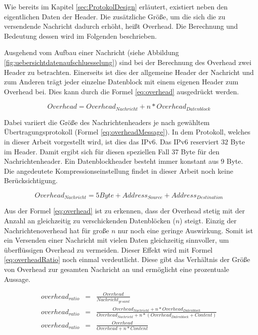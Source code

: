 Wie bereits im Kapitel \ref{sec:ProtokolDesign} erläutert, existiert neben den
eigentlichen Daten der Header. Die zusätzliche Größe, um die sich die
zu versendende Nachricht dadurch erhöht, heißt Overhead. Die Berechnung und
Bedeutung dessen wird im Folgenden beschrieben.

Ausgehend vom Aufbau einer Nachricht (siehe Abbildung
\ref{fig:uebersichtdatenaufschluesselung}) sind bei der Berechnung des Overhead
zwei Header zu betrachten. Einerseits ist dies der allgemeine Header der
Nachricht und zum Anderen trägt jeder einzelne Datenblock
mit einem eigenen Header zum Overhead bei. Dies kann durch die Formel
\ref{eq:overhead} ausgedrückt werden.

\begin{equation}
	Overhead = Overhead_{Nachricht} + n * Overhead_{Datenblock}
	\label{eq:overhead}
\end{equation}

Dabei variiert die Größe des Nachrichtenheaders je nach gewähltem
Übertragungsprotokoll (Formel \ref{eq:overheadMessage}). In dem Protokoll,
welches in dieser Arbeit vorgestellt wird, ist dies das IPv6. Das IPv6
reserviert $32$ Byte im Header. Damit ergibt sich für diesen speziellen Fall $37$ Byte für
den Nachrichtenheader. Ein Datenblockheader besteht immer konstant aus $9$ Byte.
Die angedeutete Kompressionseinstellung findet in dieser Arbeit noch
keine Berücksichtigung.

\begin{equation}
	Overhead_{Nachricht} = 5 Byte + Address_{Source} + Address_{Destination}
	\label{eq:overheadMessage}
\end{equation}

Aus der Formel \ref{eq:overhead} ist zu erkennen, dass der Overhead
stetig mit der Anzahl an gleichzeitig zu verschickenden Datenblöcken ($n$)
steigt. Einzig der Nachrichtenoverhead hat für große $n$ nur noch eine
geringe Auswirkung. Somit ist ein Versenden einer Nachricht mit vielen Daten
gleichzeitig sinnvoller, um überflüssigen Overhead zu vermeiden. Dieser
Effekt wird mit Formel \ref{eq:overheadRatio} noch einmal verdeutlicht. Diese
gibt das Verhältnis der Größe von Overhead zur gesamten Nachricht an und
ermöglicht eine prozentuale Aussage.

\begin{eqnarray} 
	overhead_{ratio} & = & \frac{Overhead}{Nachricht_{gesamt}}\\
	overhead_{ratio} & = & \frac{Overhead_{Nachricht} + n * Overhead_{Datenblock}}{Overhead_{Nachricht} + n * (Overhead_{Datenblock} + Content)}\\
	overhead_{ratio} & = & \frac{Overhead}{Overhead + n * Content}
	\label{eq:overheadRatio}
\end{eqnarray}